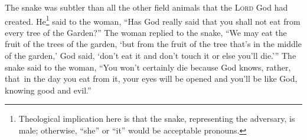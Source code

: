 
\begin{inparaenum}
     The snake was subtler than all the other field animals that the \textsc{Lord} God had created. He\footnote{Theological implication here is that the snake, representing the adversary, is male; otherwise, ``she'' or ``it'' would be acceptable pronouns.} said to the woman, ``Has God really said that you shall not eat from every tree of the Garden?''%
     The woman replied to the snake, ``We may eat the fruit of the trees of the garden,%
     `but from the fruit of the tree that's in the middle of the garden,' God said, `don't eat it and don't touch it or else you'll die.'\thinspace''%
     The snake said to the woman, ``You won't certainly die%
     because God knows, rather, that\understood\ in the day you eat from it, your eyes will be opened and you'll be like God, knowing good and evil.''%
    
    
    
    
    
    
    
\end{inparaenum}
